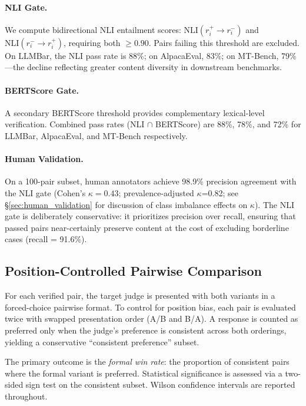 \documentclass[11pt,a4paper]{article}
\begin{document}
\paragraph{NLI Gate.} We compute bidirectional NLI entailment scores: $\text{NLI}(r_i^{+} \rightarrow r_i^{-})$ and $\text{NLI}(r_i^{-} \rightarrow r_i^{+})$, requiring both $\geq 0.90$.
Pairs failing this threshold are excluded.
On LLMBar, the NLI pass rate is 88\%; on AlpacaEval, 83\%; on MT-Bench, 79\%---the decline reflecting greater content diversity in downstream benchmarks.

\paragraph{BERTScore Gate.} A secondary BERTScore threshold provides complementary lexical-level verification.
Combined pass rates (NLI $\cap$ BERTScore) are 88\%, 78\%, and 72\% for LLMBar, AlpacaEval, and MT-Bench respectively.

\paragraph{Human Validation.} On a 100-pair subset, human annotators achieve 98.9\% precision agreement with the NLI gate (Cohen's $\kappa{=}0.43$; prevalence-adjusted $\kappa${=}0.82; see \S\ref{sec:human_validation} for discussion of class imbalance effects on $\kappa$).
The NLI gate is deliberately conservative: it prioritizes precision over recall, ensuring that passed pairs near-certainly preserve content at the cost of excluding borderline cases (recall = 91.6\%).

\subsection{Position-Controlled Pairwise Comparison}
\label{sec:pairwise_protocol}

For each verified pair, the target judge is presented with both variants in a forced-choice pairwise format.
To control for position bias, each pair is evaluated twice with swapped presentation order (A/B and B/A).
A response is counted as preferred only when the judge's preference is consistent across both orderings, yielding a conservative ``consistent preference'' subset.

The primary outcome is the \emph{formal win rate}: the proportion of consistent pairs where the formal variant is preferred.
Statistical significance is assessed via a two-sided sign test on the consistent subset.
Wilson confidence intervals are reported throughout.
\end{document}
